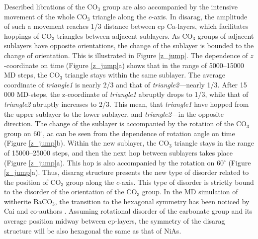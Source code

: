 \documentclass[journal=jacsat,manuscript=article]{achemso}
\begin{document}
Described librations of the CO$_3$ group are also accompanied by the intensive movement of the whole CO$_3$ triangle along the $c$-axis. 
In disarag, the amplitude of such a movement reaches 1/3 distance between cp Ca-layers, which facilitates hoppings of CO$_3$ triangles between adjacent sublayers.
As CO$_3$ groups of adjacent sublayers have opposite orientations, the change of the sublayer is bounded to the change of orientation.
This is illustrated in Figure \ref{z_jump}.
The dependence of $z$-coordinate on time (Figure \ref{z_jump}a)  shows that in the range of 5000--15000 MD steps, the CO$_3$ triangle stays within the same sublayer.
The average coordinate of {\it triangle1} is nearly 2/3 and that of {\it triangle2}---nearly 1/3.
After 15 000 MD-steps, the z-coordinate of {\it triangle1} abruptly drops to 1/3, while that of {\it triangle2} abruptly increases to 2/3.
This mean, that {\it triangle1} have hopped from the upper sublayer to the lower sublayer, and {\it triangle2}---in the opposite direction.
The change of the sublayer is accompanied by the rotation of the CO$_3$ group on 60$^{\circ}$, ac can be seen from the dependence of rotation angle on time (Figure \ref{z_jump}b). 
Within the new sublayer, the CO$_3$ triangle stays in the range of 15000--25000 steps, and then the next hop between sublayers takes place (Figure \ref{z_jump}a).
This hop is also accompanied by the rotation on 60$^{\circ}$ (Figure \ref{z_jump}a).
Thus, disarag structure presents the new type of disorder related to the position of CO$_3$ group along the $c$-axis. 
This type of disorder is strictly bound to the disorder of the orientation of the CO$_3$ group.
In the MD simulation of witherite BaCO$_3$, the transition to the hexagonal symmetry has been noticed by Cai and co-authors \cite{cai2020}.
Assuming rotational disorder of the carbonate group and its average position midway between cp-layers, the symmetry of the disarag structure will be also hexagonal the same as that of NiAs.
\end{document}
